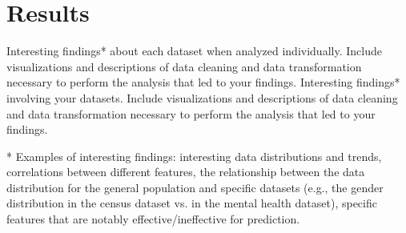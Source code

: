 \section{Results}
Interesting findings* about each dataset when analyzed individually. Include visualizations and descriptions of data cleaning and data transformation necessary to perform the analysis that led to your findings.
Interesting findings* involving your datasets. Include visualizations and descriptions of data cleaning and data transformation necessary to perform the analysis that led to your findings.

* Examples of interesting findings: interesting data distributions and trends, correlations between different features, the relationship between the data distribution for the general population and specific datasets (e.g., the gender distribution in the census dataset vs. in the mental health dataset), specific features that are notably effective/ineffective for prediction.

